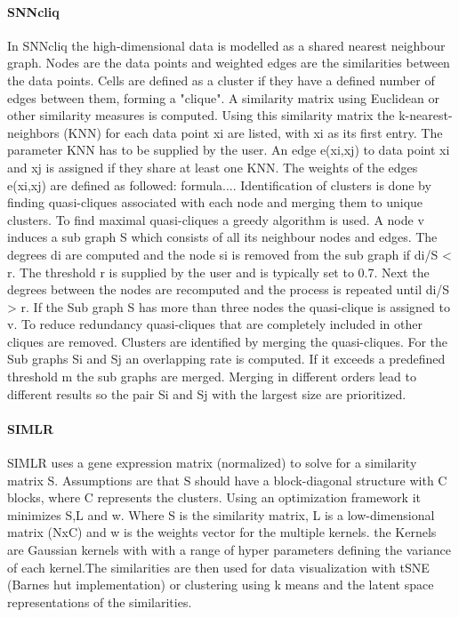 \documentclass{article}\usepackage[]{graphicx}\usepackage[]{color}
\begin{document}
\paragraph{SNNcliq}
In SNNcliq the high-dimensional data is modelled as a shared nearest neighbour graph. Nodes are the data points and weighted edges are the similarities between the data points. Cells are defined as a cluster if they have a defined number of edges between them, forming a "clique". 
A similarity matrix using Euclidean or other similarity measures is computed. Using this similarity matrix the  k-nearest-neighbors (KNN) for each data point xi are listed, with xi as its first entry. The parameter KNN has to be supplied by the user. An edge e(xi,xj) to data point xi and xj is assigned if they share at least one KNN. The weights of the edges e(xi,xj) are defined as followed:
formula....
Identification of clusters is done by finding quasi-cliques associated with each node and merging them to unique clusters.
To find maximal quasi-cliques a greedy algorithm is used. A node v induces a sub graph S which consists of all its neighbour nodes and edges. The degrees di are computed and the node si is removed from the sub graph if di/S < r. The threshold r is supplied by the user and is typically set to 0.7. Next the degrees between the nodes are recomputed and the process is repeated until di/S > r. If the Sub graph S has more than three nodes the quasi-clique is assigned to v. To reduce redundancy quasi-cliques that are completely included in other cliques are removed.
Clusters are identified by merging the quasi-cliques. For the Sub graphs Si and Sj an overlapping rate is computed. If it exceeds a predefined threshold m the sub graphs are merged. Merging in different orders lead to different results so the pair Si and Sj with the largest size are prioritized.

\paragraph{SIMLR}
SIMLR uses a gene expression matrix (normalized) to solve for a similarity matrix S. Assumptions are that S should have a block-diagonal structure with C blocks, where C represents the clusters. Using an optimization framework it minimizes S,L and w. Where S is the similarity matrix, L is a low-dimensional matrix (NxC) and w is the weights vector for the multiple kernels. the Kernels are Gaussian kernels with with a range of hyper parameters defining the variance of each kernel.The similarities are then used for data visualization with tSNE (Barnes hut implementation) or clustering using k means and the latent space representations of the similarities.
\end{document}
